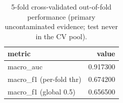 \begin{table}[htbp]\centering\caption{5-fold cross-validated out-of-fold performance (primary uncontaminated evidence; test never in the CV pool).}\label{tab:cvoof}
\begin{tabular}{lr}
\toprule
metric & value \\
\midrule
macro_auc & 0.917300 \\
macro_f1 (per-fold thr) & 0.674200 \\
macro_f1 (global 0.5) & 0.656500 \\
\bottomrule
\end{tabular}
\end{table}
